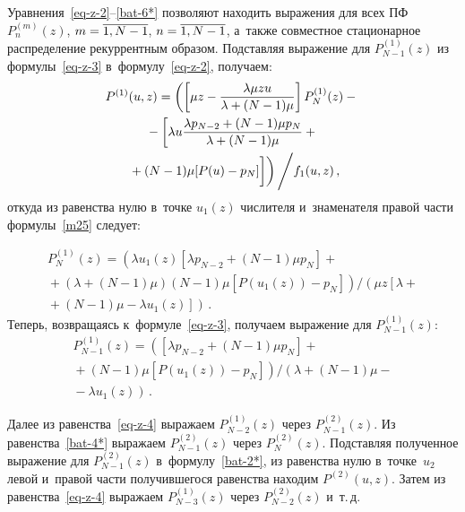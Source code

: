 \begin{multicols}{2}
Уравнения~\eqref{eq-z-2}--\eqref{bat-6*} позволяют
находить выражения для всех
ПФ $P^{(m)}_{n}(z)$, $m\hm=\overline{1,N-1}$,
$n\hm=\overline{1,N-1}$, а~так\-же совместное
стационарное распределение рекуррентным образом.
Подставляя выражение для $P^{(1)}_{N-1}(z)$ из
формулы~\eqref{eq-z-3} в~формулу~\eqref{eq-z-2}, получаем:
\begin{multline}
P^{(1)}(u,z) = \left(
\left[
\mu z - \fr{\lambda \mu z u}{\lambda+(N-1)\mu}
\right] P^{(1)}_N(z) -{}\right.\\
{}-
\left[
\lambda u \fr{\lambda p_{N-2} + (N-1)\mu p_{N}}{\lambda+(N-1)\mu}+{}\right.\\
\left.\left.{}+
 (N-1) \mu [P(u) - p_{N}]
\vphantom{\fr{\lambda p_{N-2} + (N-1)\mu p_{N}}{\lambda+(N-1)\mu}}\right]
\right)
\Bigg /
f_1(u,z)\,,
\label{m25}
\end{multline}
откуда из равенства нулю в~точке $u_1(z)$ числителя и~знаменателя
правой части формулы~\eqref{m25} следует:
\columnbreak


\noindent
\begin{multline*}
P^{(1)}_N(z)= \left(
\lambda u_1(z) [\lambda p_{N-2} + (N-1)\mu p_{N}]
+{}\right.\\
{}+
\left.(\lambda+(N-1)\mu)(N-1) \mu \left[P(u_1(z)) - p_{N}\right]\right)\!\!\Big/\!\!
\left(\mu z \left[\lambda+{}\right.\right.\\
\left.\left.{}+(N-1)\mu  - \lambda u_1(z)\right]\right)\,.
\end{multline*}
Теперь, возвращаясь к~формуле~\eqref{eq-z-3},
получаем выражение для $P^{(1)}_{N-1}(z)$:
\begin{multline*}
P^{(1)}_{N-1}(z)=
\left([\lambda p_{N-2} + (N-1)\mu p_{N}]+{}\right.\\
\left.{}
+ (N-1) \mu [P(u_1(z)) - p_{N}]\right)\Big /
\left(\lambda+(N-1)\mu  - {}\right.\\
\left.{}-\lambda u_1(z)\right)\,.
\end{multline*}

Далее из равенства~\eqref{eq-z-4} выражаем $P^{(1)}_{N-2}(z)$ через
$P^{(2)}_{N-1}(z)$. Из равенства~\eqref{bat-4*} выражаем
$P^{(2)}_{N-1}(z)$ через $P^{(2)}_{N}(z)$. Подставляя полученное
выражение для $P^{(2)}_{N-1}(z)$ в~формулу~\eqref{bat-2*}, из
равенства нулю в~точке~$u_2$ левой и~правой части получившегося
равенства находим $P^{(2)}(u,z)$. Затем из равенства~\eqref{eq-z-4}
выражаем $P^{(1)}_{N-3}(z)$ через $P^{(2)}_{N-2}(z)$ и~т.\,д.


\end{multicols}
